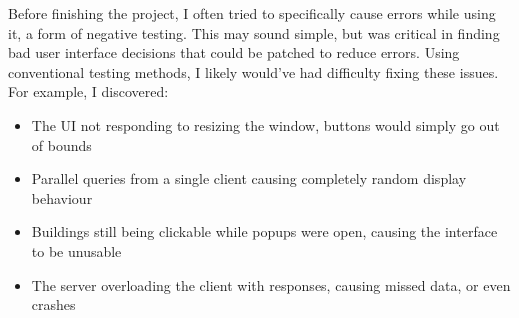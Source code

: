 Before finishing the project, I often tried to specifically cause errors while using it, a form of negative testing. This may sound simple, but was critical in finding bad user interface decisions that could be patched to reduce errors. Using conventional testing methods, I likely would've had difficulty fixing these issues. For example, I discovered:\begin{itemize}
    \item The UI not responding to resizing the window, buttons would simply go out of bounds
    \item Parallel queries from a single client causing completely random display behaviour
    \item Buildings still being clickable while popups were open, causing the interface to be unusable
    \item The server overloading the client with responses, causing missed data, or even crashes
\end{itemize}